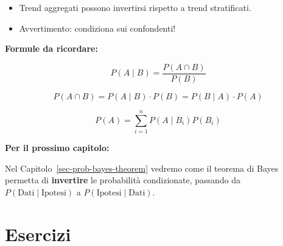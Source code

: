 \documentclass[
  italian,
  letterpaper,
  a4paper,
  11pt,
  open=any]{scrbook}
\providecommand{\tightlist}{%
  \setlength{\itemsep}{0pt}\setlength{\parskip}{0pt}}
\theoremstyle{plain}
\theoremstyle{definition}
\theoremstyle{definition}
\theoremstyle{remark}
\begin{document}
\begin{tcolorbox}
\begin{enumerate}
  \begin{itemize}
  \tightlist
  \item
    Trend aggregati possono invertirsi rispetto a trend stratificati.
  \item
    Avvertimento: condiziona sui confondenti!
  \end{itemize}
\end{enumerate}

\textbf{Formule da ricordare:}

\[
P(A \mid B) = \frac{P(A \cap B)}{P(B)}
\]

\[
P(A \cap B) = P(A \mid B) \cdot P(B) = P(B \mid A) \cdot P(A)
\]

\[
P(A) = \sum_{i=1}^{n} P(A \mid B_i) P(B_i)
\]

\textbf{Per il prossimo capitolo:}

Nel Capitolo~\ref{sec-prob-bayes-theorem} vedremo come il teorema di
Bayes permetta di \textbf{invertire} le probabilità condizionate,
passando da \(P(\text{Dati} \mid \text{Ipotesi})\) a
\(P(\text{Ipotesi} \mid \text{Dati})\).

\end{tcolorbox}

\section*{Esercizi}\label{esercizi-1}

\end{document}
